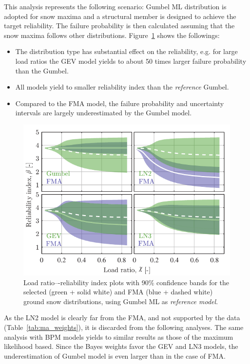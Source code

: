 This analysis represents the following scenario: Gumbel ML distribution is adopted for snow maxima and a structural member is designed to achieve the target reliability. The failure probability is then calculated assuming that the snow maxima follows other distributions. Figure~\ref{fig:beta_khi_fma_2x2} shows the followings:
\begin{itemize}
	\item The distribution type has substantial effect on the reliability, e.g. for large load ratios the GEV model yields to about 50 times larger failure probability than the Gumbel.
	\item All models yield to smaller reliability index than the \textit{reference} Gumbel.
	\item Compared to the FMA model, the failure probability and uncertainty intervals are largely underestimated by the Gumbel model.
\end{itemize}

\begin{figure}[htbp!]
	\centering    
	\includegraphics[]{khi_beta_2x2_FMA_ID2546_CI09.pdf}
	\caption{Load ratio–-reliability index plots with 90\% confidence bands for the selected (green + solid white) and FMA (blue + dashed white) ground snow distributions, using Gumbel ML as \textit{reference model}.}
	\label{fig:beta_khi_fma_2x2}
\end{figure}

As the LN2 model is clearly far from the FMA, and not supported by the data (Table~\ref{tab:ma_weights}), it is discarded from the following analyses. The same analysis with BPM models yields to similar results as those of the maximum likelihood based. Since the Bayes weights favor the GEV and LN3 models, the underestimation of Gumbel model is even larger than in the case of FMA.

